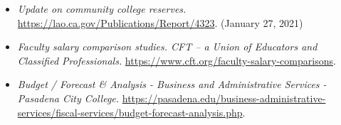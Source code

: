 \documentclass[
]{article}
\providecommand{\tightlist}{%
  \setlength{\itemsep}{0pt}\setlength{\parskip}{0pt}}
\begin{document}
\begin{itemize}
\tightlist
\item
  \emph{Update on community college reserves.}
  \url{https://lao.ca.gov/Publications/Report/4323}. (January 27, 2021)
\item
  \emph{Faculty salary comparison studies. CFT -- a Union of Educators
  and Classified Professionals.}
  \url{https://www.cft.org/faculty-salary-comparisons}.
\item
  \emph{Budget / Forecast \& Analysis - Business and Administrative
  Services - Pasadena City College.}
  \url{https://pasadena.edu/business-administrative-services/fiscal-services/budget-forecast-analysis.php}.
\end{itemize}
\end{document}
